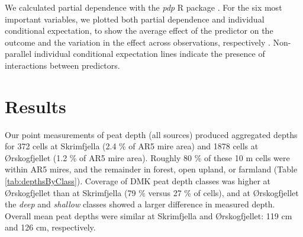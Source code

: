 \documentclass[soil, manuscript]{copernicus}
\begin{document}
We calculated partial dependence with the \emph{pdp} R package \citep[v0.8,][]{greenwellPdpPackageConstructing2017}.
For the six most important variables, we plotted both partial dependence and individual conditional expectation, to show the average effect of the predictor on the outcome and the variation in the effect across observations, respectively \citep{goldsteinPeekingBlackBox2015}.
Non-parallel individual conditional expectation lines indicate the presence of interactions between predictors.

\section{Results}

Our point measurements of peat depth (all sources) produced aggregated depths for 372 cells at Skrimfjella (2.4 \% of AR5 mire area) and 1878 cells at Ørskogfjellet (1.2 \% of AR5 mire area).
Roughly 80 \% of these 10 m cells were within AR5 mires, and the remainder in forest, open upland, or farmland (Table \ref{tab:depthsByClass}).
Coverage of DMK peat depth classes was higher at Ørskogfjellet than at Skrimfjella (79 \% versus 27 \% of cells), and at Ørskogfjellet the \emph{deep} and \emph{shallow} classes showed a larger difference in measured depth.
Overall mean peat depths were similar at Skrimfjella and Ørskogfjellet: 119 cm and 126 cm, respectively.
\end{document}
